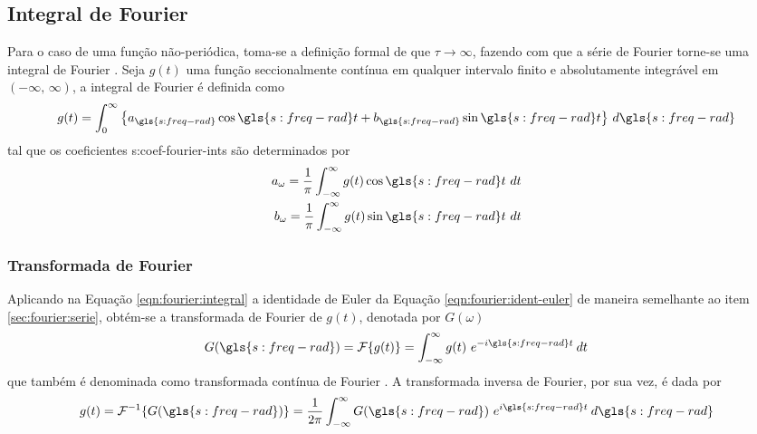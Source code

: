\documentclass[12pt,oneside,english,brazil,lmodern,siglas,simbolos,cite=num]{ucsmonograph}
\begin{document}
	\subsection{Integral de Fourier}
	Para o caso de uma função não-periódica, toma-se a definição formal de que $ \tau\to\infty $, fazendo com que a série de Fourier torne-se uma integral de Fourier \cite{spiegel:1977}.
	Seja $g(t)$ uma função seccionalmente contínua em qualquer intervalo finito e absolutamente integrável em $ (-\infty ,\,\infty) $, a integral de Fourier é definida como \cite{spiegel:1977}
	\begin{equation}\label{eqn:fourier:integral}
		g(t) = \int_{0}^{\infty}\left\lbrace a_{\gls{s:freq-rad}}\cos\gls{s:freq-rad} t + b_{\gls{s:freq-rad}}\sin\gls{s:freq-rad} t\right\rbrace\, d\gls{s:freq-rad}
	\end{equation}
	tal que os coeficientes \glspl{s:coef-fourier-int} são determinados por
	\setlength{}
	\begin{align}
		a_\omega = \frac{1}{\pi}\int_{-\infty}^{\infty}g(t)\cos\gls{s:freq-rad} t\ dt \\
		b_\omega = \frac{1}{\pi}\int_{-\infty}^{\infty}g(t)\sin\gls{s:freq-rad} t\ dt
	\end{align}
	
	\subsubsection{Transformada de Fourier} \label{sec:fourier:transform}
	Aplicando na Equação \ref{eqn:fourier:integral} a identidade de Euler da Equação \ref{eqn:fourier:ident-euler} de maneira semelhante ao item \ref{sec:fourier:serie}, obtém-se a transformada de Fourier \cite{savi:2017} de $g(t)$, denotada por $G(\omega)$
	\begin{equation} \label{eqn:fourier:transform}
		G(\gls{s:freq-rad}) = \mathcal{F}\{g(t)\} = \int_{-\infty}^{\infty}g(t)\ e^{-i\gls{s:freq-rad} t}\:dt
	\end{equation}
	que também é denominada como transformada contínua de Fourier \cite{dimarogonas:1995}.
	A transformada inversa de Fourier, por sua vez, é dada por \cite{spiegel:1977}
	\begin{equation} \label{eqn:fourier:transform-inv}
		g(t) = \mathcal{F}^{-1}\{G(\gls{s:freq-rad})\} = \frac{1}{2\pi}\int_{-\infty}^{\infty}G(\gls{s:freq-rad})\ e^{i\gls{s:freq-rad} t}\:d\gls{s:freq-rad}
	\end{equation}
	
\end{document}
